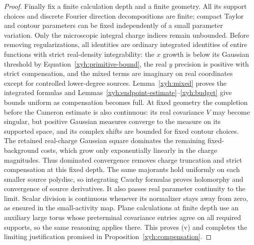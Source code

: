 \begin{proof}
Finally fix a finite calculation depth and a finite geometry. All its
support choices and discrete Fourier direction decompositions are
finite; compact Taylor and contour parameters can be fixed independently
of a small parameter variation. Only the microscopic integral charge
indices remain unbounded. Before removing regularizations, all
identities are ordinary integrated identities of entire functions with
strict real-density integrability: the $x$ growth is below its Gaussian
threshold by Equation~\eqref{xyh:primitive-bound}, the real $y$ precision
is positive with strict compensation, and the mixed terms are imaginary
on real coordinates except for controlled lower-degree sources.
Lemma~\ref{xyh:mixed} proves the integrated formulas and
Lemmas~\ref{xyh:endpoint-estimate}--\ref{xyh:budget} give bounds uniform
as compensation becomes full. At fixed geometry the completion before
the Cameron estimate is also continuous: its real covariance $V$ may
become singular, but positive Gaussian measures converge to the measure
on its supported space, and its complex shifts are bounded for fixed
contour choices. The retained real-charge Gaussian square dominates the
remaining fixed-background costs, which grow only exponentially linearly
in the charge magnitudes. Thus dominated convergence removes charge
truncation and strict compensation at this fixed depth. The same
majorants hold uniformly on each smaller source polydisc, so integrating
Cauchy formulas proves holomorphy and convergence of source derivatives.
It also passes real parameter continuity to the limit. Scalar division is
continuous whenever its normalizer stays away from zero, as ensured in
the small-activity map. Plane calculations at finite depth use an
auxiliary large torus whose preterminal covariance entries agree on
all required supports, so the same reasoning applies there. This proves
(v) and completes the limiting justification promised in
Proposition~\ref{xyh:compensation}.
\end{proof}
